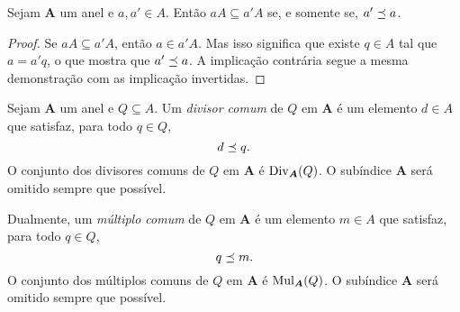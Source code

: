 \begin{proposition}
Sejam $\bm A$ um anel e $a,a' \in A$. Então $aA \subseteq a'A$ se, e somente se, $a' \preceq a$.
\end{proposition}
\begin{proof}
Se $aA \subseteq a'A$, então $a \in a'A$. Mas isso significa que existe $q \in A$ tal que $a=a'q$, o que mostra que $a' \preceq a$. A implicação contrária segue a mesma demonstração com as implicação invertidas.
\end{proof}

\begin{definition}
Sejam $\bm A$ um anel e $Q \subseteq A$. Um \emph{divisor comum} de $Q$ em $\bm A$ é um elemento $d \in A$ que satisfaz, para todo $q \in Q$,
	\begin{equation*}
	d \preceq q.
	\end{equation*}
O conjunto dos divisores comuns de $Q$ em $\bm A$ é $\operatorname{Div}_{\bm A}(Q)$. O subíndice $\bm A$ será omitido sempre que possível.

Dualmente, um \emph{múltiplo comum} de $Q$ em $\bm A$ é um elemento $m \in A$ que satisfaz, para todo $q \in Q$,
	\begin{equation*}
	q \preceq m.
	\end{equation*}
O conjunto dos múltiplos comuns de $Q$ em $\bm A$ é $\operatorname{Mul}_{\bm A}(Q)$. O subíndice $\bm A$ será omitido sempre que possível.
\end{definition}

